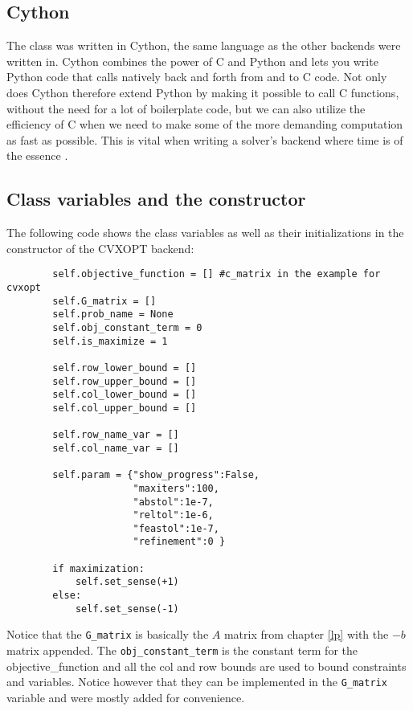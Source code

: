 \subsection{Cython}
\label{cython}
The class was written in Cython, the same language as the other backends were written in.  Cython combines the power of C and Python and lets you write Python code that calls natively back and forth from and to C code. Not only does Cython therefore extend Python by making it possible to call  C functions, without the need for a lot of boilerplate code, but we can also utilize the efficiency of C when we need to make some of the more demanding computation as fast as possible. This is vital when writing a solver's backend where time is of the essence \cite{cython}.



\subsection{Class variables and the constructor}
The following code shows the class variables as well as their initializations in the constructor of the CVXOPT backend:

\begin{verbatim}
        self.objective_function = [] #c_matrix in the example for cvxopt
        self.G_matrix = []
        self.prob_name = None
        self.obj_constant_term = 0
        self.is_maximize = 1

        self.row_lower_bound = []
        self.row_upper_bound = []
        self.col_lower_bound = []
        self.col_upper_bound = []

        self.row_name_var = []
        self.col_name_var = []

        self.param = {"show_progress":False,
                      "maxiters":100,
                      "abstol":1e-7,
                      "reltol":1e-6,
                      "feastol":1e-7,
                      "refinement":0 }

        if maximization:
            self.set_sense(+1)
        else:
            self.set_sense(-1)
\end{verbatim}
Notice that the \texttt{G\_matrix} is basically the $A$ matrix from chapter \ref{lp} with the $-b$ matrix appended. The \texttt{obj\_constant\_term} is the constant term for the objective\_function and all the col and row bounds are used to bound constraints and variables. Notice however that they can be implemented in the \texttt{G\_matrix} variable and were mostly added for convenience. 

